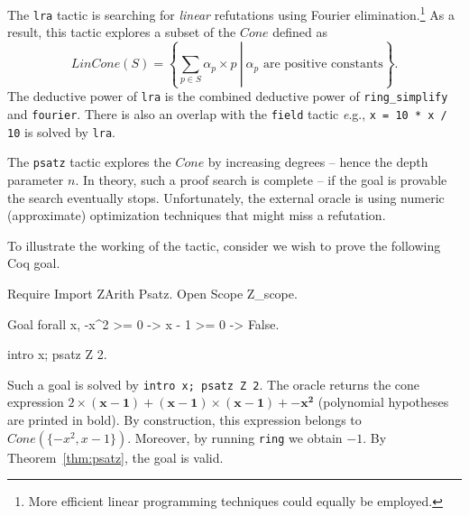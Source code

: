 \label{sec:lra}
The {\tt lra} tactic is searching for \emph{linear} refutations using
Fourier elimination.\footnote{More efficient linear programming
  techniques could equally be employed.} As a result, this tactic
explores a subset of the $\mathit{Cone}$ defined as
\[
\mathit{LinCone}(S) =\left\{ \left. \sum_{p \in S} \alpha_p \times p~\right|
~\alpha_p \mbox{ are positive constants} \right\}.
\]
The deductive power of {\tt lra} is the combined deductive power of {\tt ring\_simplify} and {\tt fourier}.
%
There is also an overlap with the {\tt field} tactic {\emph e.g.}, {\tt x = 10 * x / 10} is solved by {\tt lra}.

\label{sec:psatz}
The {\tt psatz} tactic explores the $\mathit{Cone}$ by increasing degrees -- hence the depth parameter $n$.
In theory, such a proof search is complete -- if the goal is provable the search eventually stops.
Unfortunately, the external oracle is using numeric (approximate) optimization techniques that might miss a
refutation. 

To illustrate the working of the tactic, consider we wish to prove the following Coq goal.
\begin{coq_eval}
Require Import ZArith Psatz.
Open Scope Z_scope.
\end{coq_eval}
\begin{coq_example*}
Goal forall x, -x^2 >= 0 -> x - 1 >= 0 -> False.
\end{coq_example*}
\begin{coq_eval}
intro x; psatz Z 2.
\end{coq_eval}
Such a goal is solved by {\tt intro x; psatz Z 2}. The oracle returns the
cone expression $2 \times (\mathbf{x-1}) + (\mathbf{x-1}) \times
(\mathbf{x-1}) + \mathbf{-x^2}$ (polynomial hypotheses are printed in
bold). By construction, this expression belongs to $\mathit{Cone}(\{-x^2,
x -1\})$. Moreover, by running {\tt ring} we obtain $-1$. By
Theorem~\ref{thm:psatz}, the goal is valid.
%

%

